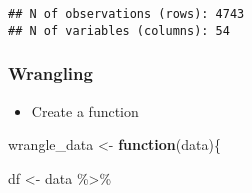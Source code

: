 \documentclass[
]{book}
\newenvironment{Shaded}{\begin{snugshade}}{\end{snugshade}}
\newcommand{\ControlFlowTok}[1]{\textcolor[rgb]{0.13,0.29,0.53}{\textbf{#1}}}
\newcommand{\NormalTok}[1]{#1}
\newcommand{\OtherTok}[1]{\textcolor[rgb]{0.56,0.35,0.01}{#1}}
\newcommand{\SpecialCharTok}[1]{\textcolor[rgb]{0.00,0.00,0.00}{#1}}
\providecommand{\tightlist}{%
  \setlength{\itemsep}{0pt}\setlength{\parskip}{0pt}}
\begin{document}
\begin{verbatim}
## N of observations (rows): 4743
## N of variables (columns): 54
\end{verbatim}

\hypertarget{wrangling-1}{%
\subsubsection{Wrangling}\label{wrangling-1}}

\begin{itemize}
\tightlist
\item
  Create a function
\end{itemize}

\begin{Shaded}
\begin{Highlighting}[]
\NormalTok{wrangle\_data }\OtherTok{\textless{}{-}} \ControlFlowTok{function}\NormalTok{(data)\{}

\NormalTok{df }\OtherTok{\textless{}{-}}\NormalTok{ data }\SpecialCharTok{\%\textgreater{}\%} 
    

\end{Highlighting}
\end{Shaded}
\end{document}
